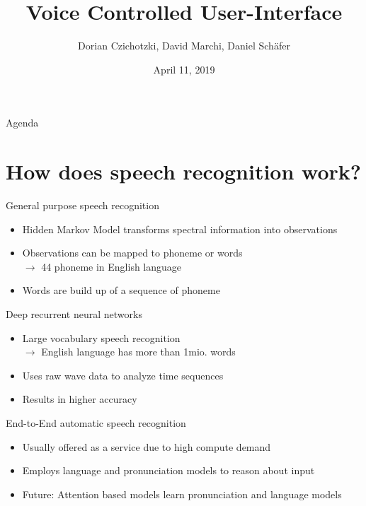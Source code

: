 \documentclass[
  10pt
, handout
]{beamer}
\title{Voice Controlled User-Interface}
\subtitle{}
\date{April 11, 2019}
\author{Dorian Czichotzki, David Marchi, Daniel Schäfer}
\begin{document}
\maketitle

\begin{frame}{Agenda}
  \tableofcontents[pausesections]
\end{frame}

\section{How does speech recognition work?}  %

\begin{frame}{General purpose speech recognition}
  \begin{itemize}
      \item Hidden Markov Model transforms spectral information into observations
      \item Observations can be mapped to phoneme or words \\
        $\rightarrow$ 44 phoneme in English language
      \item Words are build up of a sequence of phoneme
  \end{itemize}
\end{frame}

\begin{frame}{Deep recurrent neural networks}
  \begin{itemize}
      \item Large vocabulary speech recognition \\
        $\rightarrow$ English language has more than 1mio. words
        \item Uses raw wave data to analyze time sequences
        \item Results in higher accuracy
  \end{itemize}
\end{frame}

\begin{frame}{End-to-End automatic speech recognition}
    \begin{itemize}
        \item Usually offered as a service due to high compute demand
        \item Employs language and pronunciation models to reason about input
        \item Future: Attention based models learn pronunciation and language models
    \end{itemize}
\end{frame}
\end{document}
